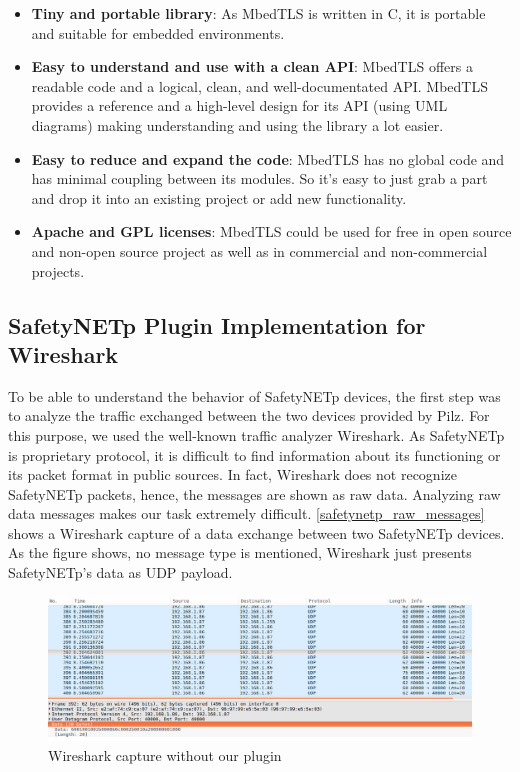 \renewcommand{\labelitemi}{$\bullet$}
\begin{itemize}
\item \textbf{Tiny and portable library}: As MbedTLS is written in C, it is portable and suitable for embedded environments.
\item \textbf{Easy to understand and use with a clean API}: MbedTLS offers a readable code and a logical,
clean, and well-documentated API. MbedTLS provides a reference and a high-level design for its API (using UML diagrams) making
understanding and using the library a lot easier.
\item \textbf{Easy to reduce and expand the code}: MbedTLS has no global code and has minimal coupling between its modules.
So it's easy to just grab a part and drop it into an existing project or add new functionality.
\item \textbf{Apache and GPL licenses}: MbedTLS could be used for free in open source and non-open source project
as well as in commercial and non-commercial projects.
\end{itemize}

\subsection{SafetyNETp Plugin Implementation for Wireshark}

To be able to understand the behavior of SafetyNETp devices, the first step was to analyze
the traffic exchanged between the two devices provided by Pilz. For this purpose, we used
the well-known traffic analyzer Wireshark. As SafetyNETp is proprietary protocol, it is difficult
to find information about its functioning or its packet format in public sources. In fact, Wireshark
does not recognize SafetyNETp packets, hence, the messages are shown as raw data. Analyzing raw data messages
makes our task extremely difficult. \autoref{safetynetp_raw_messages} shows a Wireshark capture of a data exchange between two
SafetyNETp devices. As the figure shows, no message type is mentioned, Wireshark just presents SafetyNETp's data
as UDP payload.


\begin{figure}[H]
\centering
\includegraphics[width=17cm]{figures/realization/safetynetp_raw_messages.png}
\caption{Wireshark capture without our plugin}\label{safetynetp_raw_messages}
\end{figure}

